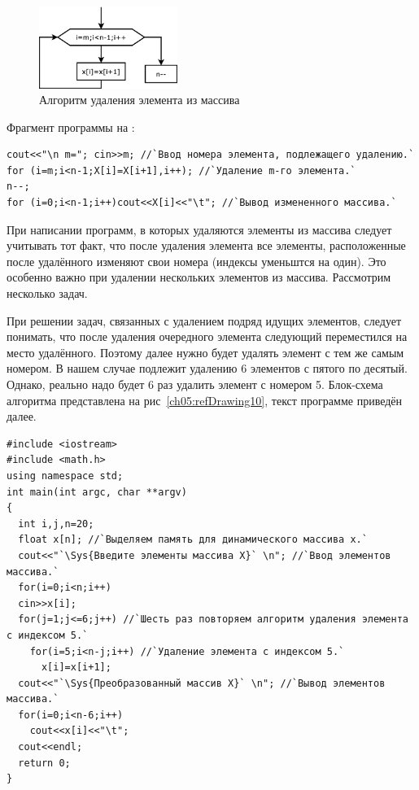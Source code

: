 \begin{figure}[htb]
\begin{center}
\includegraphics[width=0.4\textwidth]{img/ris_5_10}
\caption{Алгоритм удаления элемента из массива}
\label{ch05:refDrawing9}
\end{center}
\end{figure}

Фрагмент программы на :
\begin{lstlisting}
cout<<"\n m="; cin>>m; //`Ввод номера элемента, подлежащего удалению.` 
for (i=m;i<n-1;X[i]=X[i+1],i++); //`Удаление m-го элемента.`
n--;
for (i=0;i<n-1;i++)cout<<X[i]<<"\t"; //`Вывод измененного массива.`
\end{lstlisting}

При написании программ, в которых удаляются элементы из массива следует учитывать тот факт, что после удаления элемента
все элементы, расположенные после удалённого изменяют свои номера (индексы уменьштся на один). Это особенно важно
при удалении нескольких элементов из массива. Рассмотрим несколько задач.


При решении задач, связанных с удалением подряд идущих элементов, следует понимать, что после удаления очередного
элемента следующий переместился на место удалённого. Поэтому далее нужно будет удалять элемент с тем же самым номером. В
нашем случае подлежит удалению 6 элементов с пятого по десятый. Однако, реально надо будет 6 раз удалить элемент с
номером 5. Блок-схема алгоритма представлена на рис~\ref{ch05:refDrawing10}, текст программе приведён далее.
\begin{lstlisting}
#include <iostream>
#include <math.h>
using namespace std;
int main(int argc, char **argv)
{
  int i,j,n=20;
  float x[n]; //`Выделяем память для динамического массива x.`
  cout<<"`\Sys{Введите элементы массива X}` \n"; //`Ввод элементов массива.`
  for(i=0;i<n;i++)
  cin>>x[i];
  for(j=1;j<=6;j++) //`Шесть раз повторяем алгоритм удаления элемента с индексом 5.`
    for(i=5;i<n-j;i++) //`Удаление элемента с индексом 5.`
      x[i]=x[i+1];
  cout<<"`\Sys{Преобразованный массив X}` \n"; //`Вывод элементов массива.`
  for(i=0;i<n-6;i++)
    cout<<x[i]<<"\t";
  cout<<endl;
  return 0;
}
\end{lstlisting}

